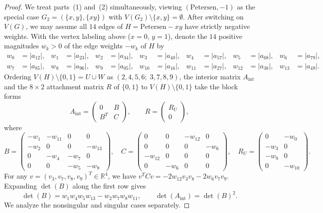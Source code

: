 \documentclass[10pt,letterpaper]{article}
\theoremstyle{zetaplain}
\theoremstyle{zetadef}
\theoremstyle{remark}
\numberwithin{equation}{section}
\begin{document}
\begin{proof}
We treat parts~(1) and~(2) simultaneously, viewing $(\mathrm{Petersen}, -1)$ as the special case $G_2 = (\{x, y\}, \{xy\})$ with $V(G_2) \setminus \{x, y\} = \emptyset$. After switching on $V(G)$, we may assume all $14$ edges of $H = \mathrm{Petersen} - xy$ have strictly negative weights. With the vertex labeling above ($x = 0$, $y = 1$), denote the $14$ positive magnitudes $w_k > 0$ of the edge weights $-w_k$ of $H$ by
\begin{align*}
  w_0 &= |a_{12}|, & w_1 &= |a_{23}|, & w_2 &= |a_{34}|, & w_3 &= |a_{40}|, & w_4 &= |a_{57}|, & w_5 &= |a_{68}|, & w_6 &= |a_{79}|, \\
  w_7 &= |a_{85}|, & w_8 &= |a_{96}|, & w_9 &= |a_{05}|, & w_{10} &= |a_{16}|, & w_{11} &= |a_{27}|, & w_{12} &= |a_{38}|, & w_{13} &= |a_{49}|.
\end{align*}
Ordering $V(H) \setminus \{0, 1\} = U \cup W$ as $(2, 4, 5, 6;\; 3, 7, 8, 9)$, the interior matrix $A_{\mathrm{int}}$ and the $8 \times 2$ attachment matrix $R$ of $\{0, 1\}$ to $V(H) \setminus \{0, 1\}$ take the block forms
\[
  A_{\mathrm{int}} = \begin{pmatrix} 0 & B \\ B^T & C \end{pmatrix}, \qquad R = \begin{pmatrix} R_U \\ 0 \end{pmatrix},
\]
where
\[
  B = \begin{pmatrix}
    -w_1 & -w_{11} & 0 & 0 \\
    -w_2 & 0 & 0 & -w_{13} \\
    0 & -w_4 & -w_7 & 0 \\
    0 & 0 & -w_5 & -w_8
  \end{pmatrix}, \quad
  C = \begin{pmatrix}
    0 & 0 & -w_{12} & 0 \\
    0 & 0 & 0 & -w_6 \\
    -w_{12} & 0 & 0 & 0 \\
    0 & -w_6 & 0 & 0
  \end{pmatrix}, \quad
  R_U = \begin{pmatrix}
    0 & -w_0 \\
    -w_3 & 0 \\
    -w_9 & 0 \\
    0 & -w_{10}
  \end{pmatrix}.
\]
For any $v = (v_3, v_7, v_8, v_9)^T \in \mathbb{R}^4$, we have $v^T C v = -2w_{12} v_3 v_8 - 2w_6 v_7 v_9$. Expanding $\det(B)$ along the first row gives
\[
  \det(B) = w_1 w_4 w_5 w_{13} - w_2 w_7 w_8 w_{11}, \qquad \det(A_{\mathrm{int}}) = \det(B)^2.
\]
We analyze the nonsingular and singular cases separately.


\end{proof}
\end{document}
